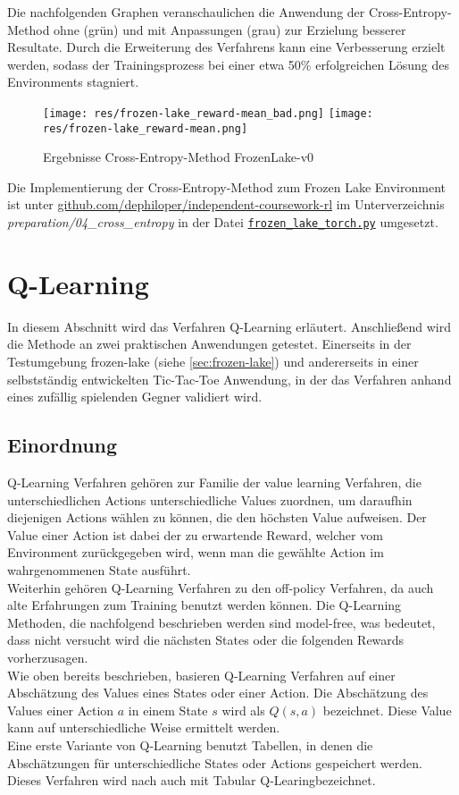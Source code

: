 \documentclass[11pt]{scrartcl}
\begin{document}
Die nachfolgenden Graphen veranschaulichen die Anwendung der Cross-Entropy-Method ohne (grün)
und mit Anpassungen (grau) zur Erzielung besserer Resultate. Durch die Erweiterung des
Verfahrens kann eine Verbesserung erzielt werden, sodass der Trainingsprozess bei einer
etwa 50\% erfolgreichen Lösung des Environments stagniert.

\begin{figure}[htp]
\centering
\texttt{[image: res/frozen-lake\_reward-mean\_bad.png]}
\texttt{[image: res/frozen-lake\_reward-mean.png]}
\caption{Ergebnisse Cross-Entropy-Method FrozenLake-v0}
\label{fig:frozen-lake_cross-entropy}
\end{figure}

Die Implementierung der Cross-Entropy-Method zum Frozen Lake Environment ist unter
\url{github.com/dephiloper/independent-coursework-rl} im Unterverzeichnis 
\textit{preparation/04\_cross\_entropy} in der Datei 
\href{https://github.com/dephiloper/independent-coursework-rl/blob/master/preparation/04_cross_entropy/frozen_lake_torch.py}{\nolinkurl{frozen\_lake\_torch.py}} umgesetzt.
\newpage


\section{Q-Learning}
In diesem Abschnitt wird das Verfahren Q-Learning erläutert. Anschließend wird die Methode
an zwei praktischen Anwendungen getestet. Einerseits in der Testumgebung frozen-lake 
(siehe \autoref{sec:frozen-lake}) und andererseits in einer selbstständig entwickelten
Tic-Tac-Toe Anwendung, in der das Verfahren anhand eines zufällig spielenden Gegner
validiert wird.


\subsection{Einordnung}
Q-Learning Verfahren gehören zur Familie der value learning Verfahren, die
unterschiedlichen Actions unterschiedliche Values zuordnen, um daraufhin diejenigen Actions
wählen zu können, die den höchsten Value aufweisen. Der Value einer Action ist dabei der
zu erwartende Reward, welcher vom Environment zurückgegeben wird, wenn man die gewählte
Action im wahrgenommenen State ausführt.\\
Weiterhin gehören Q-Learning Verfahren zu den off-policy Verfahren, da auch alte
Erfahrungen zum Training benutzt werden können. Die Q-Learning Methoden, die nachfolgend
beschrieben werden sind model-free, was bedeutet, dass nicht versucht wird die nächsten
States oder die folgenden Rewards vorherzusagen.\\
Wie oben bereits beschrieben, basieren Q-Learning Verfahren auf einer Abschätzung des
Values eines States oder einer Action. Die Abschätzung des Values einer Action $a$ in
einem State $s$ wird als $Q(s, a)$ bezeichnet. Diese Value kann auf unterschiedliche
Weise ermittelt werden.\\
Eine erste Variante von Q-Learning benutzt Tabellen, in denen die Abschätzungen
für unterschiedliche States oder Actions gespeichert werden. Dieses Verfahren wird nach
\cite[~S.193]{L2018} auch mit \grqq Tabular Q-Learing\grqq bezeichnet.
\end{document}
